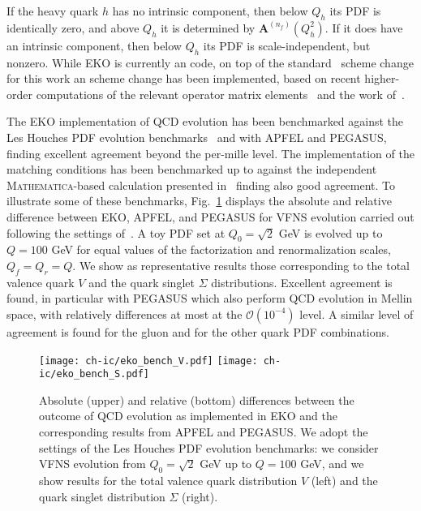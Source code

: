 If the heavy quark $h$ has no intrinsic component, then below $Q_h$
its PDF is identically zero, and above $Q_h$ it is determined by
$\mathbf{A}^{(n_f)}(Q_{h}^2)$. If it does have an intrinsic
component, then  below $Q_h$ its PDF is scale-independent, but nonzero.
While  \textsc{\small EKO} is currently an \nnlo code, on
top of the standard~\cite{pdfnnlo} \nnlo scheme change for this work
an \nnnlo scheme change has been implemented, based on recent higher-order computations
of the relevant operator matrix elements~\cite{Bierenbaum:2009zt,Bierenbaum:2009mv,Ablinger:2010ty,Ablinger:2014vwa,Ablinger:2014uka,Behring:2014eya,Blumlein:2017wxd,Ablinger_2014,Ablinger:2014nga}
and the work of~\cite{zanoli}.

The  \textsc{\small EKO} implementation of QCD evolution has been
benchmarked against the Les Houches PDF evolution
benchmarks~\cite{Dittmar:2005ed,Giele:2002hx} and with
\textsc{\small APFEL} and \textsc{\small PEGASUS},
finding excellent agreement beyond the per-mille level.
%
The implementation of the  matching conditions
has been benchmarked up to \nnnlo against the independent \textsc{\small Mathematica}-based calculation 
presented in~\cite{zanoli} finding also good agreement.
%
To illustrate some of these benchmarks, Fig.~\ref{fig:ic/EKObench} displays
the absolute and relative difference between \textsc{\small EKO},
\textsc{\small APFEL}, and \textsc{\small PEGASUS}
for \nnlo VFNS evolution
carried out
following the settings of~\cite{Dittmar:2005ed,Giele:2002hx}.
%
A toy PDF set at $Q_0=\sqrt{2}$ GeV is evolved up to $Q=100$ GeV
for equal values of the factorization and renormalization scales, $Q_f=Q_r=Q$.
%
We show as representative results those corresponding to
the  total valence quark  $V$ 
and the quark singlet $\Sigma$ distributions.
%
Excellent agreement is found, in particular
with \textsc{\small PEGASUS} which also perform QCD
evolution in Mellin space, with relatively differences
at most at the $\mathcal{O}\left( 10^{-4}\right)$ level.
%
A similar level of agreement is found
for the gluon and for the other quark PDF combinations.

\begin{figure}[t]
    \begin{center}
        \texttt{[image: ch-ic/eko\_bench\_V.pdf]}
        \texttt{[image: ch-ic/eko\_bench\_S.pdf]}
        \caption{\small Absolute (upper) and relative (bottom) differences between 
        the outcome of \nnlo QCD evolution
        as implemented in
        \textsc{\small EKO} and the
        corresponding results from \textsc{\small APFEL} and \textsc{\small PEGASUS}.
We adopt the settings of the Les Houches PDF evolution benchmarks: we
consider  VFNS evolution from $Q_0=\sqrt{2}$ GeV up to $Q=100$ GeV,
and we show  results for the total valence quark distribution $V$ (left)
and the quark singlet distribution $\Sigma$ (right).
      \label{fig:ic/EKObench} }
    \end{center}
\end{figure}



